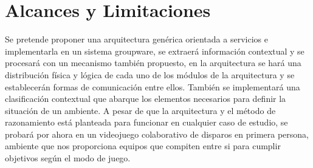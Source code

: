 \section{Alcances y Limitaciones}
Se pretende proponer una arquitectura gen\'erica orientada a servicios e implementarla en un sistema groupware, se extraer\'a informaci\'on contextual y se procesar\'a con un mecanismo tambi\'en propuesto, en la arquitectura se har\'a una distribuci\'on f\'isica y l\'ogica de cada uno de los m\'odulos de la arquitectura y se establecer\'an formas de comunicaci\'on entre ellos. Tambi\'en se implementar\'a una clasificaci\'on contextual que abarque los elementos necesarios para definir la situaci\'on de un ambiente. A pesar de que la arquitectura y el m\'etodo de razonamiento est\'a planteada para funcionar en cualquier caso de estudio, se probar\'a  por ahora en un videojuego colaborativo de disparos en primera persona, ambiente que nos proporciona equipos que compiten entre si para cumplir objetivos seg\'un el modo de juego.

